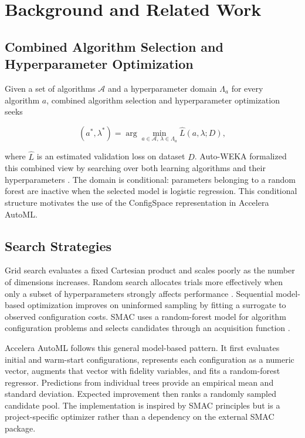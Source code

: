 \documentclass[12pt,a4paper,oneside]{report}
\newcommand{\systemname}{Accelera AutoML}
\begin{document}
\chapter{Background and Related Work}
\label{chap:background}

\section{Combined Algorithm Selection and Hyperparameter Optimization}

Given a set of algorithms $\mathcal{A}$ and a hyperparameter domain
$\Lambda_a$ for every algorithm $a$, combined algorithm selection and
hyperparameter optimization seeks

\begin{equation}
  (a^*, \lambda^*) =
  \arg\min_{a \in \mathcal{A},\,\lambda \in \Lambda_a}
  \widehat{L}(a, \lambda; D),
\end{equation}

\medskip
\noindent where $\widehat{L}$ is an estimated validation loss on dataset $D$. Auto-WEKA
formalized this combined view by searching over both learning algorithms and
their hyperparameters \cite{autoweka}. The domain is conditional: parameters
belonging to a random forest are inactive when the selected model is logistic
regression. This conditional structure motivates the use of the ConfigSpace
representation in \systemname{}.

\section{Search Strategies}

Grid search evaluates a fixed Cartesian product and scales poorly as the
number of dimensions increases. Random search allocates trials more effectively
when only a subset of hyperparameters strongly affects performance
\cite{randomsearch}. Sequential model-based optimization improves on uninformed
sampling by fitting a surrogate to observed configuration costs. SMAC uses a
random-forest model for algorithm configuration problems and selects candidates
through an acquisition function \cite{smac}.

\medskip
\noindent \systemname{} follows this general model-based pattern. It first evaluates
initial and warm-start configurations, represents each configuration as a
numeric vector, augments that vector with fidelity variables, and fits a
random-forest regressor. Predictions from individual trees provide an empirical
mean and standard deviation. Expected improvement then ranks a randomly sampled
candidate pool. The implementation is inspired by SMAC principles but is a
project-specific optimizer rather than a dependency on the external SMAC
package.
\end{document}
